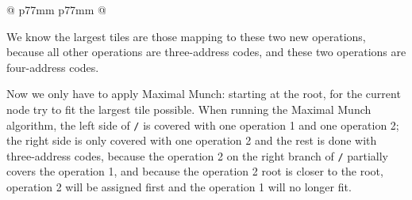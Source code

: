 \documentclass[docid=2021]{comp_exam_round1}
\begin{document}
\begin{center}
\begin{tabular}{@{} p{77mm} p{77mm} @{}}
\begin{minipage}{\linewidth}
\begin{tikzpicture}
                                                x
                                            ]
                                            x
                                        ]
                                        5
                                    ]
                                    [.+
                                        [.*
                                            [.*
                                                3
                                                x
                                            ]
                                            x
                                        ]
                                        1
                                    ]
                                ]
                            ]
                        ];

                \draw [rounded corners=4mm] (-0.4,-4.5) -- ++(-1.4, -3.1) -- ++(+1.6,0) -- ++(0.65, 1.4) -- cycle;
                \draw [rounded corners=4mm] (+2.1,-3.5) -- ++(-1.4, -3.1) -- ++(+1.6,0) -- ++(0.65, 1.4) -- cycle;

                \draw [rounded corners=4mm, dashed] (+0.5,-2.4) -- ++(-0.9, -1.7) -- ++(+0.9,-1.7) -- ++(0.9, 1.7) -- cycle;
                \draw [rounded corners=4mm, dashed] (+2.55,-2.4) -- ++(-0.9, -1.7) -- ++(+0.9,-1.7) -- ++(0.9, 1.7) -- cycle;
            \end{tikzpicture}
        \end{minipage}%
    \end{tabular}
\end{center}

We know the largest tiles are those mapping to these two new operations, because all other operations are three-address codes, and these two operations are four-address codes.

Now we only have to apply Maximal Munch: starting at the root, for the current node try to fit the largest tile possible. When running the Maximal Munch algorithm, the left side of \texttt{/} is covered with one operation 1 and one operation 2; the right side is only covered with one operation 2 and the rest is done with three-address codes, because the operation 2 on the right branch of \texttt{/} partially covers the operation 1, and because the operation 2 root is closer to the root, operation 2 will be assigned first and the operation 1 will no longer fit.
\end{document}
